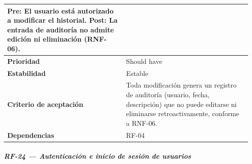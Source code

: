 \documentclass[
]{article}
\begin{document}
{\begin{longtable}[]{|
  >{\raggedright\arraybackslash}p{}|
  >{\raggedright\arraybackslash}p{}|}
\begin{minipage}[t]{\linewidth}
Pre: El usuario está autorizado a modificar el historial. Post: La entrada de auditoría no admite edición ni eliminación (RNF-06).
\end{minipage} \\
\hline
\textbf{Prioridad} & \begin{minipage}[t]{\linewidth}\raggedright
Should have
\end{minipage} \\
\hline
\textbf{Estabilidad} & \begin{minipage}[t]{\linewidth}\raggedright
Estable
\end{minipage} \\
\hline
\textbf{Criterio de aceptación} &
\begin{minipage}[t]{\linewidth}\raggedright
Toda modificación genera un registro de auditoría (usuario, fecha, descripción) que no puede editarse ni eliminarse retroactivamente, conforme a RNF-06.
\end{minipage} \\
\hline
\textbf{Dependencias} & \begin{minipage}[t]{\linewidth}\raggedright
RF-04
\end{minipage} \\
\hline
\end{longtable}
}

\subparagraph{RF-24 --- Autenticación e inicio de sesión de usuarios}\label{rf-24-autenticaci-n-e-inicio-de-sesi-n-de-usua}
\end{document}
